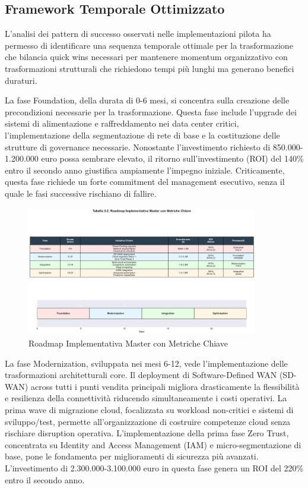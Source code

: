 \subsection{Framework Temporale Ottimizzato}

L'analisi dei pattern di successo osservati nelle implementazioni pilota ha permesso di identificare una sequenza temporale ottimale per la trasformazione che bilancia quick wins necessari per mantenere momentum organizzativo con trasformazioni strutturali che richiedono tempi più lunghi ma generano benefici duraturi.

La fase Foundation, della durata di 0-6 mesi, si concentra sulla creazione delle precondizioni necessarie per la trasformazione. Questa fase include l'upgrade dei sistemi di alimentazione e raffreddamento nei data center critici, l'implementazione della segmentazione di rete di base e la costituzione delle strutture di governance necessarie. Nonostante l'investimento richiesto di 850.000-1.200.000 euro possa sembrare elevato, il ritorno sull'investimento (ROI) del 140\% entro il secondo anno giustifica ampiamente l'impegno iniziale. Criticamente, questa fase richiede un forte commitment del management esecutivo, senza il quale le fasi successive rischiano di fallire.

\begin{figure}[htbp]
\centering
\includegraphics[width=0.9\textwidth]{thesis_figures/cap5/tab_5_2_roadmap.pdf}
\caption{Roadmap Implementativa Master con Metriche Chiave}
\label{tab:roadmap_master}
\end{figure}

La fase Modernization, sviluppata nei mesi 6-12, vede l'implementazione delle trasformazioni architetturali core. Il deployment di Software-Defined WAN (SD-WAN) across tutti i punti vendita principali migliora drasticamente la flessibilità e resilienza della connettività riducendo simultaneamente i costi operativi. La prima wave di migrazione cloud, focalizzata su workload non-critici e sistemi di sviluppo/test, permette all'organizzazione di costruire competenze cloud senza rischiare disruption operativa. L'implementazione della prima fase Zero Trust, concentrata su Identity and Access Management (IAM) e micro-segmentazione di base, pone le fondamenta per miglioramenti di sicurezza più avanzati. L'investimento di 2.300.000-3.100.000 euro in questa fase genera un ROI del 220\% entro il secondo anno.

